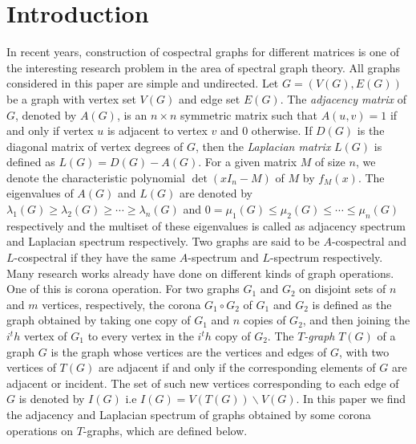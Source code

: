 \documentclass[a4paper,12pt]{article}
\begin{document}
\section{Introduction}
In recent years, construction of cospectral graphs for different matrices is one of the interesting research problem in the area of spectral graph theory. 
All graphs considered in this paper are simple and undirected. Let $G=(V(G),E(G))$ be a graph with vertex set $V(G)$ and edge set $E(G)$. The \textit{adjacency matrix} of $G$, denoted by $A(G)$, is an $n\times n$ symmetric matrix such that $A(u,v)=1$ if and only if vertex $u$ is adjacent to vertex $v$ and $0$ otherwise. If $D(G)$ is the diagonal matrix of vertex degrees of $G$, then the \textit{Laplacian matrix} $L(G)$ is defined as $L(G)=D(G)-A(G)$. For a given matrix $M$ of size $n$, we denote the characteristic polynomial $\det(xI_{n}-M)$ of $M$ by $f_{M}(x)$. The eigenvalues of $A(G)$ and $L(G)$ are denoted by $\lambda_{1}(G)\geq\lambda_{2}(G)\geq\cdots\geq\lambda_{n}(G)$ and $0=\mu_{1}(G)\leq\mu_{2}(G)\leq\cdots\leq\mu_{n}(G)$ respectively and the multiset of these eigenvalues is called as adjacency spectrum and Laplacian spectrum respectively. Two graphs are said to be $A$-cospectral and $L$-cospectral if they have the same $A$-spectrum and $L$-spectrum respectively. Many research works already have done on different kinds of graph operations. One of this is corona operation. For two graphs $G_{1}$ and $G_{2}$ on disjoint sets of $n$ and $m$ vertices, respectively, the corona \cite{Har} $G_{1}\circ G_{2}$ of $G_{1}$ and $G_{2}$ is defined as the graph obtained by taking one copy of $G_{1}$ and $n$ copies of $G_{2}$, and then joining the $i^th$ vertex of $G_{1}$ to every vertex in the $i^th$ copy of $G_{2}$.
The \textit{$T$-graph} $T(G)$ \cite{Cv} of a graph $G$ is the graph whose vertices are the vertices and edges of $G$, with two vertices of $T(G)$ are adjacent if and only if the corresponding elements of $G$ are adjacent or incident. The set of such new vertices corresponding to each edge of $G$ is denoted by $I(G)$ i.e $I(G)=V(T(G))\backslash V(G)$.
In this paper we find the adjacency and Laplacian spectrum of graphs obtained by some corona operations on $T$-graphs, which are defined below.
\end{document}
